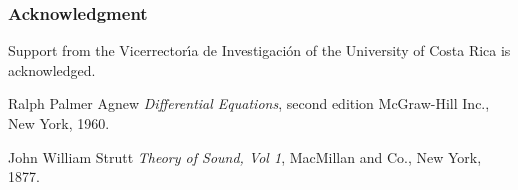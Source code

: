 \documentclass[12pt]{article}
\numberwithin{equation}{section}
\begin{document}
\subsubsection*{Acknowledgment}
 Support from the Vicerrector\'{\i}a de Investigaci\'on of the 
University of Costa Rica is acknowledged.



\begin{thebibliography}{}

Ralph Palmer Agnew
\textit{Differential Equations}, second edition
McGraw-Hill Inc., New York, 1960.




John William Strutt
\textit{Theory of Sound, Vol 1},
MacMillan and Co., New York, 1877.





\end{thebibliography}
\end{document}
